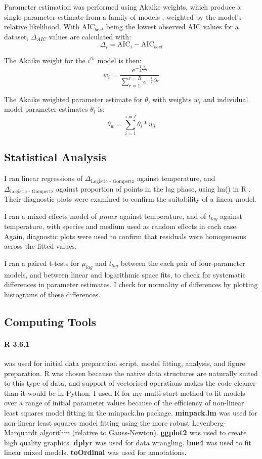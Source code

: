 \documentclass[11pt, a4paper]{article}
\begin{document}
\begin{linenumbers}
Parameter estimation was performed using Akaike weights, which produce a single parameter estimate from a family of models \cite{ModelSelection}, weighted by the model’s relative likelihood.
With $\text{AIC}_{best}$ being the lowest observed AIC values for a dataset, $\Delta_{AIC}$ values are calculated with:
\[ \Delta_i = \text{AIC}_i - \text{AIC}_{best} \]

The Akaike weight for the $i^{th}$ model is then:
\[ w_i = \frac{e^{-\frac{1}{2}\Delta_i }} { \sum_{r = 1}^{r = R}  e^{- \frac{1}{2}\Delta_r }}\]

The Akaike weighted parameter estimate for $\theta$, with weights $w_i$ and individual model parameter estimates $\theta_i$ is:
\[\theta_w = \sum_{i = 1}^{i = I}\theta_i * w_i\]


\subsection{Statistical Analysis}

I ran linear regressions of $\Delta_{\text{Logistic - Gompertz}}$ against temperature, and $\Delta_{\text{Logistic - Gompertz}}$ against proportion of points in the lag phase, using lm() in R \cite{R}. Their diagnostic plots were examined to confirm the suitability of a linear model.

I ran a mixed effects model of $\mu{max}$ against temperature, and of $t_{lag}$ against temperature, with species and medium used as random effects in each case. Again, diagnostic plots were used to confirm that residuals were homogeneous across the fitted values.

I ran a paired t-tests for $\mu_{lag}$ and $t_{lag}$ between the each pair of four-parameter models, and between linear and logarithmic space fits, to check for systematic differences in parameter estimates. I check for normality of differences by plotting histograms of these differences.  

\subsection{Computing Tools}
\paragraph{R 3.6.1 \cite{R}} was used for initial data preparation script, model fitting, analysis, and figure preparation. R was chosen because the native data structures are naturally suited to this type of data, and support of vectorised operations makes the code cleaner than it would be in Python. I used R for my multi-start method to fit models over a range of initial parameter values because of the efficiency of non-linear least squares model fitting in the minpack.lm package. \textbf{minpack.lm \cite{minpack}} was used for non-linear least squares model fitting using the more robust Levenberg-Marquardt algorithm (relative to Gauss-Newton). \textbf{ggplot2 \cite{gg}} was used to create high quality graphics. \textbf{dplyr \cite{dplyr}} was used for data wrangling. \textbf{lme4 \cite{lme4}} was used to fit linear mixed models. \textbf{toOrdinal \cite{tO}} was used for annotations.


\end{linenumbers}
\end{document}
